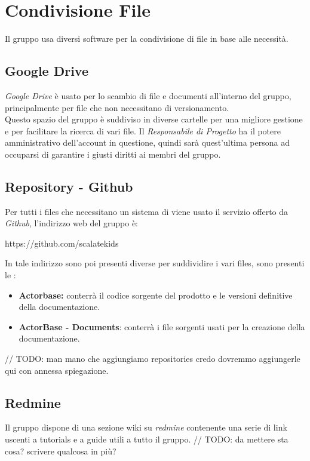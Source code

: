 \section{Condivisione File}
Il gruppo usa diversi software per la condivisione di file in base alle necessità.

\subsection{Google Drive}
\textit{Google Drive} è usato per lo scambio di file e documenti all'interno del gruppo, principalmente per file che non necessitano di versionamento.\\
Questo spazio del gruppo è suddiviso in diverse cartelle per una migliore gestione e per facilitare la ricerca di vari file.
Il \textit{Responsabile di Progetto} ha il potere amministrativo dell'account in questione, quindi sarà quest'ultima persona ad occuparsi di garantire i giusti diritti ai membri del gruppo.

\subsection{Repository - Github}
Per tutti i files che necessitano un sistema di  viene usato il servizio offerto da \textit{Github}, l'indirizzo web del gruppo è:
\begin{center}
https://github.com/scalatekids
\end{center}

In tale indirizzo sono poi presenti diverse  per suddividire i vari files, sono presenti le :
\begin{itemize}
  \item \textbf{Actorbase:} conterrà il codice sorgente del prodotto e le versioni definitive della documentazione.
  \item \textbf{ActorBase - Documents}: conterrà i file sorgenti usati per la creazione della documentazione.
\end{itemize}
	// TODO: man mano che aggiungiamo repositories credo dovremmo aggiungerle qui con annessa spiegazione.

\subsection{Redmine}
Il gruppo dispone di una sezione wiki su \textit{redmine} contenente una serie di link uscenti a tutorials e a guide utili a tutto il gruppo.
// TODO: da mettere sta cosa? scrivere qualcosa in più?
